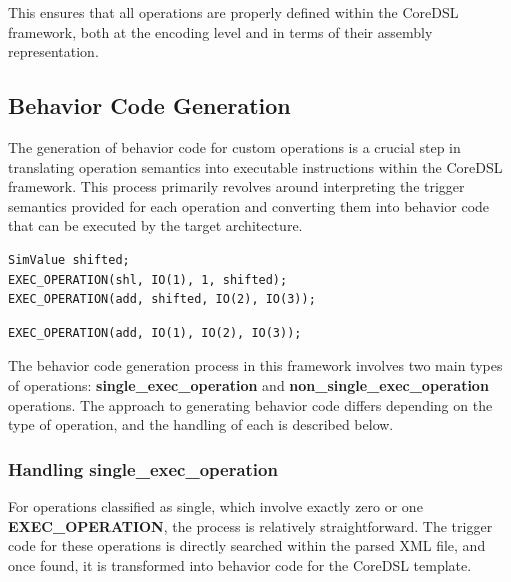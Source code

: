 This ensures that all operations are properly defined within the CoreDSL framework, both at the encoding level and in terms of their assembly representation.

\subsection{Behavior Code Generation}

The generation of behavior code for custom operations is a crucial step in translating operation semantics into executable instructions within the CoreDSL framework. This process primarily revolves around interpreting the trigger semantics provided for each operation and converting them into behavior code that can be executed by the target architecture.

\begin{lstlisting}[caption={Non-Single Exec Operation Semantics Example},captionpos=b]
SimValue shifted;
EXEC_OPERATION(shl, IO(1), 1, shifted);
EXEC_OPERATION(add, shifted, IO(2), IO(3));
\end{lstlisting}
\begin{lstlisting}[caption={Single Exec Operation Semantics Example},captionpos=b]
EXEC_OPERATION(add, IO(1), IO(2), IO(3));
\end{lstlisting}

The behavior code generation process in this framework involves two main types of operations: \textbf{single\_exec\_operation} and \textbf{non\_single\_exec\_operation} operations. The approach to generating behavior code differs depending on the type of operation, and the handling of each is described below.

\subsubsection{Handling \textbf{single\_exec\_operation}}

For operations classified as single, which involve exactly zero or one \textbf{EXEC\_OPERATION}, the process is relatively straightforward. The trigger code for these operations is directly searched within the parsed XML file, and once found, it is transformed into behavior code for the CoreDSL template.

